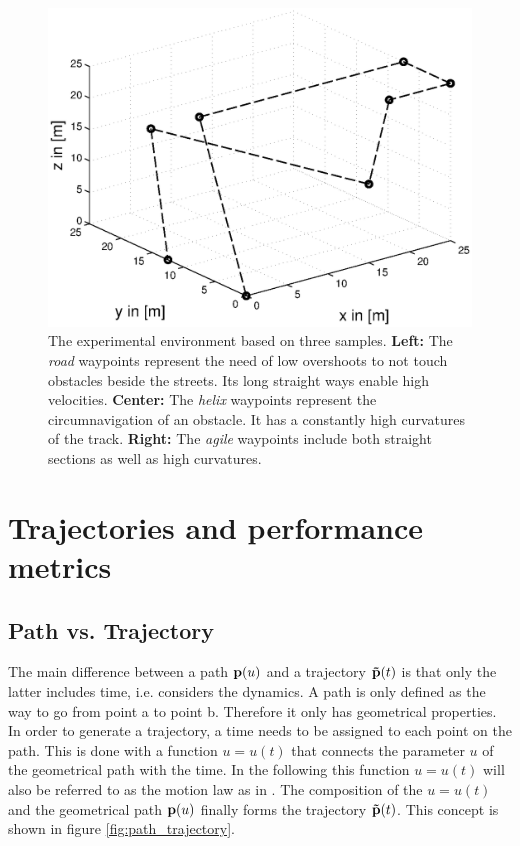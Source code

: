 \begin{figure}[h]
\begin{minipage}[t]{0.32\textwidth}
    \includegraphics[width = \textwidth]{graphics/sampleNodeAgile}
  \end{minipage}
  \caption{The experimental environment based on three samples. {\bf Left:} The \textit{road} waypoints represent the need of low overshoots to not touch obstacles beside the streets. Its long straight ways enable high velocities. {\bf Center:} The \textit{helix} waypoints represent the circumnavigation of an obstacle. It has a constantly high curvatures of the track. {\bf Right:} The \textit{agile} waypoints include both straight sections as well as high curvatures.}
  \label{fig:sampleNodes}
\end{figure}

\section{Trajectories and performance metrics}
\label{sec:definition}
\subsection{Path vs. Trajectory}
The main difference between a path $ {\bf p}(u)$ and a trajectory $ {\bf \tilde{p}}(t)$ is that only the latter includes time, i.e. considers the dynamics. A path is only defined as the way to go from point a to point b. Therefore it only has geometrical properties. In order to generate a trajectory, a time needs to be assigned to each point on the path. This is done with a function $u=u(t)$ that connects the parameter $u$ of the geometrical path with the time. In the following this function $u=u(t)$ will also be referred to as the motion law as in \cite{snider}. The composition of the $u=u(t)$ and the geometrical path ${\bf p}(u)$ finally forms the trajectory ${\bf \tilde{p}}(t)$. This concept is shown in figure \ref{fig:path_trajectory}.

